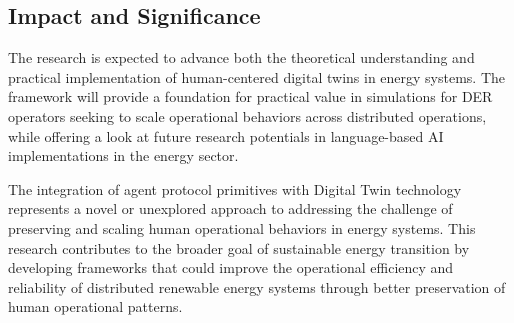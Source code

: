\documentclass[12pt,a4paper]{article}
\begin{document}
\subsection{Impact and Significance}

The research is expected to advance both the theoretical understanding and practical implementation of human-centered digital twins in energy systems. The framework will provide a foundation for practical value in simulations for DER operators seeking to scale operational behaviors across distributed operations, while offering a look at future research potentials in language-based AI implementations in the energy sector.

The integration of agent protocol primitives with Digital Twin technology represents a novel or unexplored approach to addressing the challenge of preserving and scaling human operational behaviors in energy systems. This research contributes to the broader goal of sustainable energy transition by developing frameworks that could improve the operational efficiency and reliability of distributed renewable energy systems through better preservation of human operational patterns.

\clearpage

\printbibliography
\end{document}
